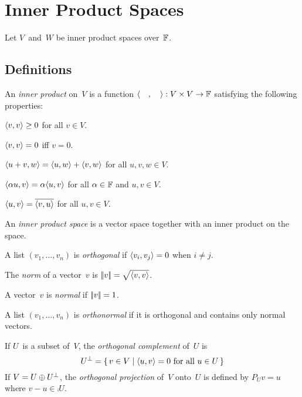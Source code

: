 %
%
%
\section{Inner Product Spaces}
Let \(V\)~and~\(W\) be inner product spaces over~\(\mathbb{F}\).
\subsection*{Definitions}
\begin{defn}
An \emph{inner product} on~\(V\) is a function \(\langle{\quad},{\quad}\rangle:V\times V\to\mathbb{F}\) satisfying the following properties:
\begin{description}[itemsep=0pt]
\item[Positivity] \(\langle{v},{v}\rangle\ge0\) for all \(v\in V\).
\item[Definiteness] \(\langle{v},{v}\rangle=0\) iff \(v=0\).
\item[Left additivity] \(\langle{u+v},{w}\rangle=\langle{u},{w}\rangle+\langle{v},{w}\rangle\) for all \(u,v,w\in V\).
\item[Left homogeneity] \(\langle{\alpha u},{v}\rangle=\alpha\langle{u},{v}\rangle\) for all \(\alpha\in\mathbb{F}\) and \(u,v\in V\).
\item[Conjugate symmetry] \(\langle{u},{v}\rangle=\overline{\langle{v},{u}\rangle}\) for all \(u,v\in V\).
\end{description}
An \emph{inner product space} is a vector space together with an inner product on the space.
\end{defn}

\begin{defn}
A list \((v_1,\ldots,v_n)\) is \emph{orthogonal} if \(\langle{v_i},{v_j}\rangle=0\) when \(i\ne j\).
\end{defn}

\begin{defn}
The \emph{norm} of a vector~\(v\) is \(\left|\!\left|{v}\right|\!\right|=\sqrt{\langle{v},{v}\rangle}\).
\end{defn}

\begin{defn}
A vector~\(v\) is \emph{normal} if \(\left|\!\left|{v}\right|\!\right|=1\).
\end{defn}

\begin{defn}
A list \((v_1,\ldots,v_n)\) is \emph{orthonormal} if it is orthogonal and contains only normal vectors.
\end{defn}

\begin{defn}
If \(U\)~is a subset of~\(V\), the \emph{orthogonal complement} of~\(U\) is
\[{U}^{\perp}=\{\,v\in V\mid\langle{u},{v}\rangle=0\text{ for all }u\in U\,\}\]
If \(V=U\oplus{U}^{\perp}\), the \emph{orthogonal projection} of~\(V\) onto~\(U\) is defined by \(P_Uv=u\) where \(v-u\in\comp{U}\).
\end{defn}


